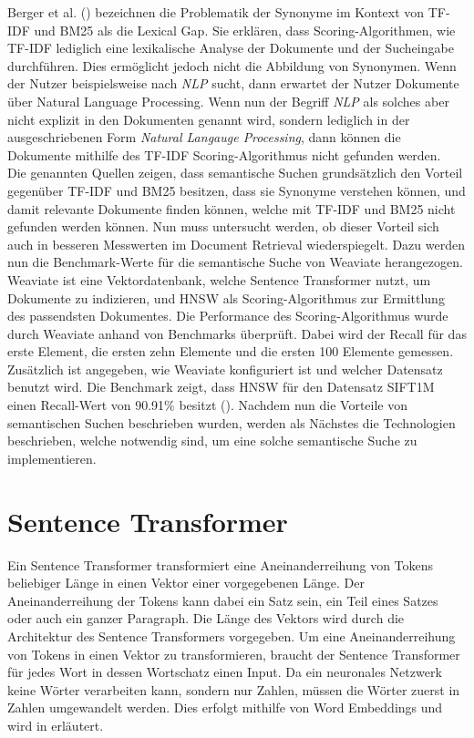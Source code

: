 Berger et al. (\citeyear{Berger_Caruana_Cohn_Freitag_Mittal_2000}) bezeichnen die Problematik der Synonyme im Kontext von TF-IDF und BM25 als die Lexical Gap.
Sie erklären, dass Scoring-Algorithmen, wie TF-IDF lediglich eine lexikalische Analyse der Dokumente und der Sucheingabe durchführen.
Dies ermöglicht jedoch nicht die Abbildung von Synonymen.
Wenn der Nutzer beispielsweise nach \textit{NLP} sucht, dann erwartet der Nutzer Dokumente über Natural Language Processing.
Wenn nun der Begriff \textit{NLP} als solches aber nicht explizit in den Dokumenten genannt wird, sondern lediglich in der ausgeschriebenen Form \textit{Natural Langauge Processing}, dann können die Dokumente mithilfe des TF-IDF Scoring-Algorithmus nicht gefunden werden.\\

Die genannten Quellen zeigen, dass semantische Suchen grundsätzlich den Vorteil gegenüber TF-IDF und BM25 besitzen, dass sie Synonyme verstehen können, und damit relevante Dokumente finden können, welche mit TF-IDF und BM25 nicht gefunden werden können.
Nun muss untersucht werden, ob dieser Vorteil sich auch in besseren Messwerten im Document Retrieval wiederspiegelt.
Dazu werden nun die Benchmark-Werte für die semantische Suche von Weaviate herangezogen. 
Weaviate ist eine Vektordatenbank, welche Sentence Transformer nutzt, um Dokumente zu indizieren, und HNSW als Scoring-Algorithmus zur Ermittlung des passendsten Dokumentes.
Die Performance des Scoring-Algorithmus wurde durch Weaviate anhand von Benchmarks überprüft.
Dabei wird der Recall für das erste Element, die ersten zehn Elemente und die ersten 100 Elemente gemessen.
Zusätzlich ist angegeben, wie Weaviate konfiguriert ist und welcher Datensatz benutzt wird.
Die Benchmark zeigt, dass HNSW für den Datensatz SIFT1M einen Recall-Wert von 90.91\% besitzt (\cite{Weaviate_Benchmark}).
Nachdem nun die Vorteile von semantischen Suchen beschrieben wurden, werden als Nächstes die Technologien beschrieben, welche notwendig sind, um eine solche semantische Suche zu implementieren.

\section{Sentence Transformer}
\label{chap:sentence-transformer}

Ein Sentence Transformer transformiert eine Aneinanderreihung von Tokens beliebiger Länge in einen Vektor einer vorgegebenen Länge.
Der Aneinanderreihung der Tokens kann dabei ein Satz sein, ein Teil eines Satzes oder auch ein ganzer Paragraph.
Die Länge des Vektors wird durch die Architektur des Sentence Transformers vorgegeben.
Um eine Aneinanderreihung von Tokens in einen Vektor zu transformieren, braucht der Sentence Transformer für jedes Wort in dessen Wortschatz einen Input.
Da ein neuronales Netzwerk keine Wörter verarbeiten kann, sondern nur Zahlen, müssen die Wörter zuerst in Zahlen umgewandelt werden.
Dies erfolgt mithilfe von Word Embeddings und wird in  erläutert.\\

